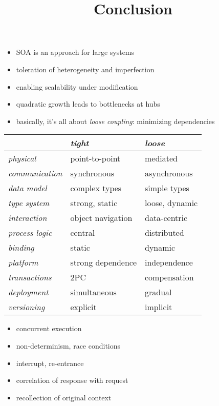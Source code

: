 \documentclass{sepslide-soa-faked} %
\title{Conclusion}
\begin{document}
\begin{slide}
  \Title
\end{slide}

\begin{slide}
  \Contents
\end{slide}

\begin{slide}
\begin{itemize}
\item SOA is an approach for large systems
\item toleration of heterogeneity and imperfection
\item enabling scalability under modification
\item quadratic growth leads to bottlenecks at hubs
\medskip
\item basically, it's all about \emph{loose coupling}:
 minimizing dependencies
\end{itemize}
\end{slide}

\begin{slide}
\begin{flushleft}
\begin{tabular}{@{}l|l|l@{}}
 & \textit{tight} & \textit{loose} \\ \hline
\textit{physical} & point-to-point & mediated \\
\textit{communication} & synchronous & asynchronous \\
\textit{data model} & complex types & simple types \\
\textit{type system} & strong, static & loose, dynamic \\
\textit{interaction} & object navigation & data-centric \\
\textit{process logic} & central & distributed \\
\textit{binding} & static & dynamic \\
\textit{platform} & strong dependence & independence \\
\textit{transactions} & 2PC & compensation \\
\textit{deployment} & simultaneous & gradual \\
\textit{versioning} & explicit & implicit
\end{tabular}
\end{flushleft}
\end{slide}

\begin{slide}
\begin{itemize}
\item concurrent execution
\item non-determinism, race conditions
\item interrupt, re-entrance
\item correlation of response with request
\item recollection of original context
\end{itemize}
\end{slide}
\end{document}

